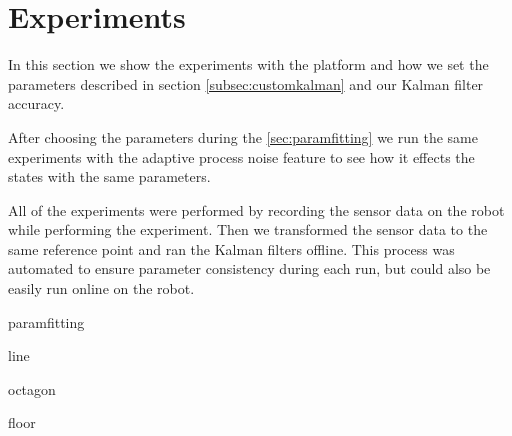 \documentclass[class=report, crop=false]{standalone}
\begin{document}
\chapter{Experiments}

In this section we show the experiments with the platform and how we set the parameters described in section \ref{subsec:customkalman} and our Kalman filter accuracy.

After choosing the parameters during the \ref{sec:paramfitting} we run the same experiments with the adaptive process noise feature to see how it effects the states with the same parameters.

All of the experiments were performed by recording the sensor data on the robot while performing the experiment. Then we transformed the sensor data to the same reference point and ran the Kalman filters offline. This process was automated to ensure parameter consistency during each run, but could also be easily run online on the robot.

{paramfitting}

{line}

{octagon}

{floor}
\end{document}
